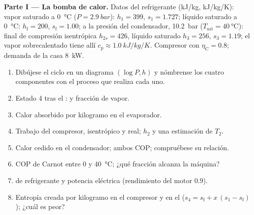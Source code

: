 \begin{problem}\label{pb:b2:open-systems:1}
\textbf{Parte I --- La bomba de calor.}
Datos del refrigerante (\unit{kJ/kg}, \unit{kJ/kg/K}): vapor saturado a
\qty{0}{\celsius} ($P = \qty{2.9}{bar}$): $h_1 = 399$, $s_1 = 1.727$;
líquido saturado a \qty{0}{\celsius}: $h_{\text{f}} = 200$, $s_{\text{f}} = 1.00$;
a la presión del condensador, \qty{10.2}{bar} ($T_{\text{sat}} = \qty{40}{\celsius}$):
final de compresión isentrópica $h_{2s} = 426$, líquido saturado $h_3 = 256$,
$s_3 = 1.19$; el vapor sobrecalentado tiene allí $c_p \approx \qty{1.0}{kJ/kg/K}$.
Compresor con $\eta_{\text{C}} = 0.8$; demanda de la casa \qty{8}{kW}.
\begin{enumerate}
  \item Dibújese el ciclo en un diagrama $(\log P, h)$ y nómbrense los cuatro
        componentes con el proceso que realiza cada uno.
  \item Estado 4 tras el :  y fracción de vapor.
  \item Calor absorbido por kilogramo en el evaporador.
  \item Trabajo del compresor, isentrópico y real; $h_2$ y una estimación de
        $T_2$.
  \item Calor cedido en el condensador; ambos COP; compruébese su
        relación.
  \item COP de Carnot entre \qty{0}{} y \qty{40}{\celsius}; ¿qué
        fracción alcanza la máquina?
  \item {} de refrigerante y potencia eléctrica (rendimiento
        del motor $0.9$).
  \item Entropía creada por kilogramo en el compresor y en el
         ($s_4 = s_{\text{f}} + x\,(s_1 - s_{\text{f}})$); ¿cuál es
        peor?
\end{enumerate}


\end{problem}
